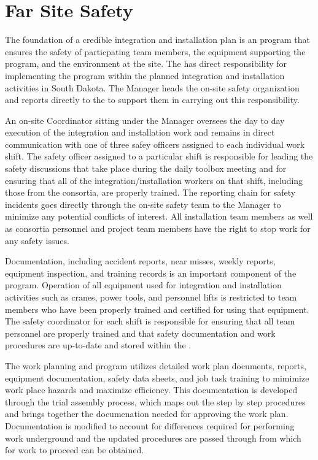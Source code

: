 \section{Far Site Safety}
\label{sec:far_site_safety}

The foundation of a credible integration and installation plan is 
an  program that ensures the safety of particpating team 
members, the equipment supporting the program, and the environment 
at the  site.  The  has direct responsibility 
for implementing the   program within 
the planned integration and installation activities in South Dakota.  
The   Manager heads the on-site safety 
organization and reports directly to the  to support them
in carrying out this responsibility.

An on-site  Coordinator sitting under the  
 Manager oversees the day to day execution of the integration 
and installation work and remains in direct communication with one of 
three safey officers assigned to each individual work shift.  The safety 
officer assigned to a particular shift is responsible for leading the 
safety discussions that take place during the daily toolbox meeting and 
for ensuring that all of the integration/installation workers on that 
shift, including those from the consortia, are properly trained.  The 
reporting chain for safety incidents goes directly through the on-site 
safety team to the   Manager to minimize 
any potential conflicts of interest.  All  installation team 
members as well as  consortia personnel and  project 
team members have the right to stop work for any safety issues.

Documentation, including accident reports, near misses, weekly reports, 
equipment inspection, and training records is an important component of 
the   program.  Operation of all equipment 
used for integration and installation activities such as cranes, power 
tools, and personnel lifts is restricted to team members who have been
properly trained and certified for using that equipment.  The safety 
coordinator for each shift is responsible for ensuring that all team 
personnel are properly trained and that safety documentation and work 
procedures are up-to-date and stored within the .  

The work planning and  program utilizes detailed work
plan documents,   reports, equipment documentation,
safety data sheets,  and job task training to mimimize work place
hazards and maximize efficiency.  This documentation is developed
through the  trial assembly process, which maps out the 
step by step procedures and brings together the documenation needed 
for approving the work plan.  Documentation is modified to account for  
differences required for performing work underground and the updated 
procedures are passed through  from which   
 for work to proceed can be 
obtained.

